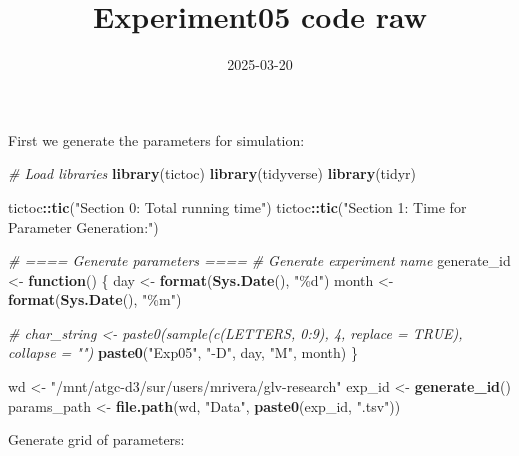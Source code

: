\documentclass[
]{article}
\title{Experiment05 code raw}
\author{}
\date{\vspace{-2.5em}2025-03-20}
\newenvironment{Shaded}{\begin{snugshade}}{\end{snugshade}}
\newcommand{\CommentTok}[1]{\textcolor[rgb]{0.56,0.35,0.01}{\textit{#1}}}
\newcommand{\ControlFlowTok}[1]{\textcolor[rgb]{0.13,0.29,0.53}{\textbf{#1}}}
\newcommand{\FunctionTok}[1]{\textcolor[rgb]{0.13,0.29,0.53}{\textbf{#1}}}
\newcommand{\NormalTok}[1]{#1}
\newcommand{\OtherTok}[1]{\textcolor[rgb]{0.56,0.35,0.01}{#1}}
\newcommand{\SpecialCharTok}[1]{\textcolor[rgb]{0.81,0.36,0.00}{\textbf{#1}}}
\newcommand{\StringTok}[1]{\textcolor[rgb]{0.31,0.60,0.02}{#1}}
\begin{document}
\maketitle

First we generate the parameters for simulation:

\begin{Shaded}
\begin{Highlighting}[]
\CommentTok{\# Load libraries}
\FunctionTok{library}\NormalTok{(tictoc)}
\FunctionTok{library}\NormalTok{(tidyverse)}
\FunctionTok{library}\NormalTok{(tidyr)}

\NormalTok{tictoc}\SpecialCharTok{::}\FunctionTok{tic}\NormalTok{(}\StringTok{"Section 0: Total running time"}\NormalTok{)}
\NormalTok{tictoc}\SpecialCharTok{::}\FunctionTok{tic}\NormalTok{(}\StringTok{"Section 1: Time for Parameter Generation:"}\NormalTok{)}

\CommentTok{\# ==== Generate parameters ====}
\CommentTok{\# Generate experiment name}
\NormalTok{generate\_id }\OtherTok{\textless{}{-}} \ControlFlowTok{function}\NormalTok{() \{}
\NormalTok{  day }\OtherTok{\textless{}{-}} \FunctionTok{format}\NormalTok{(}\FunctionTok{Sys.Date}\NormalTok{(), }\StringTok{"\%d"}\NormalTok{)}
\NormalTok{  month }\OtherTok{\textless{}{-}} \FunctionTok{format}\NormalTok{(}\FunctionTok{Sys.Date}\NormalTok{(), }\StringTok{"\%m"}\NormalTok{)}
  
  \CommentTok{\# char\_string \textless{}{-} paste0(sample(c(LETTERS, 0:9), 4, replace = TRUE), collapse = "")}
  \FunctionTok{paste0}\NormalTok{(}\StringTok{"Exp05"}\NormalTok{, }\StringTok{"{-}D"}\NormalTok{, day, }\StringTok{"M"}\NormalTok{, month)}
\NormalTok{\}}

\NormalTok{wd }\OtherTok{\textless{}{-}} \StringTok{"/mnt/atgc{-}d3/sur/users/mrivera/glv{-}research"}
\NormalTok{exp\_id }\OtherTok{\textless{}{-}} \FunctionTok{generate\_id}\NormalTok{()}
\NormalTok{params\_path }\OtherTok{\textless{}{-}} \FunctionTok{file.path}\NormalTok{(wd, }\StringTok{"Data"}\NormalTok{, }\FunctionTok{paste0}\NormalTok{(exp\_id, }\StringTok{".tsv"}\NormalTok{))}
\end{Highlighting}
\end{Shaded}

Generate grid of parameters:
\end{document}
